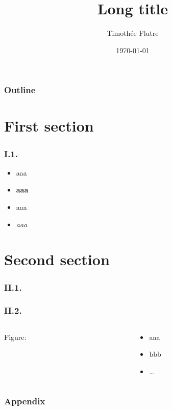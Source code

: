 \documentclass[c]{beamer} %
\title[Short title]{Long title}
\author[T. Flutre]{Timothée Flutre}
\institute[Short affiliation]{Long affiliation}
\date{\today}
\begin{document}
\begin{frame}
  \titlepage
\end{frame}

\begin{frame}
  \frametitle{Outline}
  \tableofcontents
\end{frame}

\section{First section}

\begin{frame}
  \frametitle{I.1.}
  \begin{itemize}
  \item aaa
  \item \textbf{aaa}
  \item \alert{aaa}
  \item \emph{aaa}
  \end{itemize}
\end{frame}

\section{Second section}

\begin{frame}
  \frametitle{II.1.}
  \begin{center}
  \end{center}
\end{frame}

\begin{frame}
  \frametitle{II.2.}
  \begin{columns}
    \begin{column}{0.5\textwidth}
      Figure:
      \begin{center}
      \end{center}
    \end{column}
    \begin{column}{0.5\textwidth}
      \begin{itemize}
      \item aaa
      \item bbb
      \item \dots
      \end{itemize}
    \end{column}
  \end{columns}
\end{frame}

\appendix
{}
\setcounter{finalframe}{\value{framenumber}}

\begin{frame}
  \frametitle{Appendix}
\end{frame}

\setcounter{framenumber}{\value{finalframe}}
\end{document}
